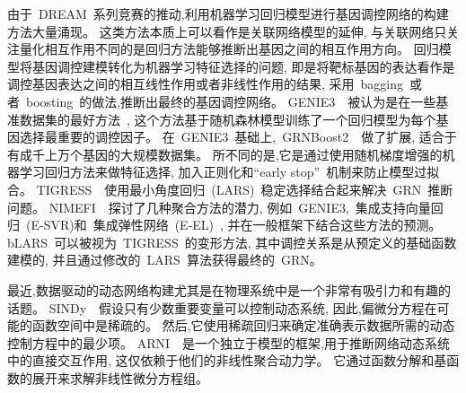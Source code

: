 


由于~DREAM~系列竞赛的推动,利用机器学习回归模型进行基因调控网络的构建方法大量涌现。
这类方法本质上可以看作是关联网络模型的延伸,
与关联网络只关注量化相互作用不同的是回归方法能够推断出基因之间的相互作用方向。
回归模型将基因调控建模转化为机器学习特征选择的问题,
即是将靶标基因的表达看作是调控基因表达之间的相互线性作用或者非线性作用的结果,
采用~bagging~或者~boosting~的做法,推断出最终的基因调控网络。
GENIE3~\cite{huynh2010inferring}~被认为是在一些基准数据集的最好方法~\cite{marbach2010revealing},
这个方法基于随机森林模型训练了一个回归模型为每个基因选择最重要的调控因子。
在~GENIE3~基础上,~GRNBoost2~\cite{moerman2019grnboost2}~做了扩展, 适合于有成千上万个基因的大规模数据集。
所不同的是,它是通过使用随机梯度增强的机器学习回归方法来做特征选择, 
加入正则化和``early stop”~机制来防止模型过拟合。 
TIGRESS~\cite{Haury2012}~使用最小角度回归~(LARS)~稳定选择结合起来解决~GRN~推断问题。
NIMEFI~\cite{ruyssinck2014nimefi}~探讨了几种聚合方法的潜力,
例如~GENIE3,~集成支持向量回归~(E-SVR)和~集成弹性网络~(E-EL)~\cite{zou2005regularization},
并在一般框架下结合这些方法的预测。
bLARS~\cite{singh2016blars}可以被视为~TIGRESS~的变形方法,
其中调控关系是从预定义的基础函数建模的, 并且通过修改的~LARS~算法获得最终的~GRN。

最近,数据驱动的动态网络构建尤其是在物理系统中是一个非常有吸引力和有趣的话题。
SINDy~\cite{brunton2016discovering}~假设只有少数重要变量可以控制动态系统,
因此,偏微分方程在可能的函数空间中是稀疏的。
然后,它使用稀疏回归来确定准确表示数据所需的动态控制方程中的最少项。
ARNI~\cite{casadiego2017model}~是一个独立于模型的框架,用于推断网络动态系统中的直接交互作用,
这仅依赖于他们的非线性聚合动力学。
它通过函数分解和基函数的展开来求解非线性微分方程组。


